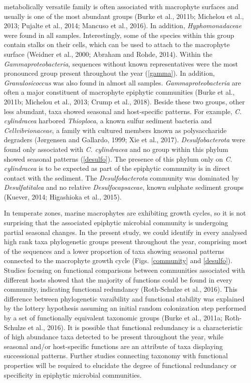 \documentclass[
  12pt,
]{article}
\begin{document}
metabolically versatile family is often associated with macrophyte
surfaces and usually is one of the most abundant groups (Burke et al.,
2011b; Michelou et al., 2013; Pujalte et al., 2014; Mancuso et al.,
2016). In addition, \emph{Hyphomonadaceae} were found in all samples.
Interestingly, some of the species within this group contain stalks on
their cells, which can be used to attach to the macrophyte surface
(Weidner et al., 2000; Abraham and Rohde, 2014). Within the
\emph{Gammaproteobacteria}, sequences without known representatives were
the most pronounced group present throughout the year (\autoref{gamma}).
In addition, \emph{Granulosicoccus} was also found in almost all
samples. \emph{Gammaproteobacteria} are often a major constituent of
macrophyte epiphytic communities (Burke et al., 2011b; Michelou et al.,
2013; Crump et al., 2018). Beside these two groups, other less abundant,
taxa showed seasonal and host-specific patterns. For example, \emph{C.
cylindracea} harbored \emph{Thioploca}, a known sulfur sediment bacteria
and \emph{Cellvibrionaceae}, a family with cultured members known as
polysaccharide degraders (Jørgensen and Gallardo, 1999; Xie et al.,
2017). \emph{Desulfobacterota} were found only associated with \emph{C.
cylindracea} and no group within this phylum showed seasonal patterns
(\autoref{desulfo}). The presence of this phylum only on \emph{C.
cylindracea} is to be expected as part of the epiphytic community is in
direct contact with the sediment. The \emph{Desulfobacterota} community
was dominated by \emph{Desulfatitalea} and no relative
\emph{Desulfocapsaceae}, known sulphate sediment groups (Kuever, 2014;
Higashioka et al., 2015).

In temperate zones, marine macrophytes are exhibiting growth cycles, so
it is not surprising that the associated epiphytic microbial community
is undergoing partial seasonal changes. In the present study, we could
identify in every analysed high rank taxa phylogenetic groups present
throughout the year, comprising most of the sequences and a lower
proportion of taxa showing seasonal patterns connected to the macrophyte
growth cycle (Figs. \ref{community} and \ref{desulfo}). Studies focusing
on functional comparisons between communities associated with different
hosts showed that the majority of functions could be found in every
community, indicating functional redundancy (Roth-Schulze et al., 2016).
This difference between phylogenetic varaibility and functional
stability was explained by the lottery hypothesis assuming an initial
random colonization step performed by a set of functionally equivalent
taxonomic groups (Burke et al., 2011a; Roth-Schulze et al., 2016). It is
possible that functional redundancy is a characteristic of high
abundance taxa detected to be present throughout the year, while
seasonal and/or host-specific functions are an attribute of taxa
displaying successional patterns. Further studies connecting taxonomy
with functional properties will be required to elucidate the degree of
functional redundancy or specificity in epiphytic microbial communities.
\end{document}
